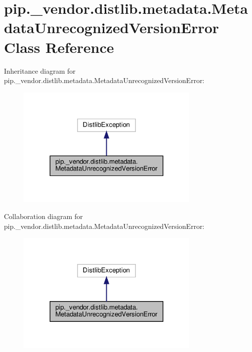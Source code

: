 \hypertarget{classpip_1_1__vendor_1_1distlib_1_1metadata_1_1MetadataUnrecognizedVersionError}{}\section{pip.\+\_\+vendor.\+distlib.\+metadata.\+Metadata\+Unrecognized\+Version\+Error Class Reference}
\label{classpip_1_1__vendor_1_1distlib_1_1metadata_1_1MetadataUnrecognizedVersionError}


Inheritance diagram for pip.\+\_\+vendor.\+distlib.\+metadata.\+Metadata\+Unrecognized\+Version\+Error\+:
\nopagebreak
\begin{figure}[H]
\begin{center}
\leavevmode
\includegraphics[width=251pt]{classpip_1_1__vendor_1_1distlib_1_1metadata_1_1MetadataUnrecognizedVersionError__inherit__graph}
\end{center}
\end{figure}


Collaboration diagram for pip.\+\_\+vendor.\+distlib.\+metadata.\+Metadata\+Unrecognized\+Version\+Error\+:
\nopagebreak
\begin{figure}[H]
\begin{center}
\leavevmode
\includegraphics[width=251pt]{classpip_1_1__vendor_1_1distlib_1_1metadata_1_1MetadataUnrecognizedVersionError__coll__graph}
\end{center}
\end{figure}



